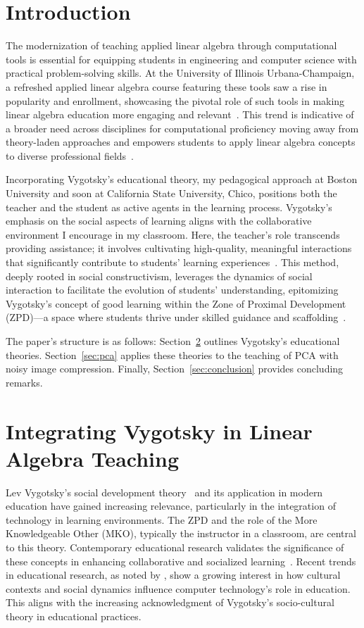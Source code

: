 \documentclass{article}
\begin{document}
\section{Introduction}
The modernization of teaching applied linear algebra through computational tools is essential for equipping students in engineering and computer science with practical problem-solving skills. 
At the University of Illinois Urbana-Champaign, a refreshed applied linear algebra course featuring these tools saw a rise in popularity and enrollment, showcasing the pivotal role of such tools in making linear algebra education more engaging and relevant~\cite{silva2022innovating}. 
This trend is indicative of a broader need across disciplines for computational proficiency moving away from theory-laden approaches and empowers students to apply linear algebra concepts to diverse professional fields~\cite{silva2022innovating, hutchison2021integrating,corless2023teaching}.


Incorporating Vygotsky's educational theory, my pedagogical approach at Boston University and soon at California State University, Chico, positions both the teacher and the student as active agents in the learning process. 
Vygotsky's emphasis on the social aspects of learning aligns with the collaborative environment I encourage in my classroom. 
Here, the teacher's role transcends providing assistance; it involves cultivating high-quality, meaningful interactions that significantly contribute to students' learning experiences~\cite{tharp1991rousing}. 
This method, deeply rooted in social constructivism, leverages the dynamics of social interaction to facilitate the evolution of students' understanding, epitomizing Vygotsky's concept of good learning within the Zone of Proximal Development (ZPD)—a space where students thrive under skilled guidance and scaffolding~\cite{vygotsky1978mind}.

The paper's structure is as follows: Section~\ref{sec:piagetvygotsky} outlines Vygotsky's educational theories. 
Section~\ref{sec:pca} applies these theories to the teaching of PCA with noisy image compression. 
Finally, Section~\ref{sec:conclusion} provides concluding remarks.

\section{Integrating Vygotsky in Linear Algebra Teaching}
\label{sec:piagetvygotsky}
Lev Vygotsky's social development theory~\cite{vygotsky1978mind} and its application in modern education have gained increasing relevance, particularly in the integration of technology in learning environments. 
The ZPD and the role of the More Knowledgeable Other (MKO), typically the instructor in a classroom, are central to this theory. 
Contemporary educational research validates the significance of these concepts in enhancing collaborative and socialized learning~\cite{cicconi2014vygotsky,gooch2011integration}.
Recent trends in educational research, as noted by \cite{verenikina2010vygotsky}, show a growing interest in how cultural contexts and social dynamics influence computer technology's role in education. 
This aligns with the increasing acknowledgment of Vygotsky's socio-cultural theory in educational practices.
\end{document}
